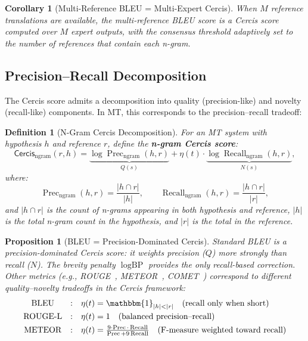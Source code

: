 \documentclass[12pt,a4paper]{article}
\newtheorem{proposition}[theorem]{Proposition}
\newtheorem{corollary}[theorem]{Corollary}
\newtheorem{definition}[theorem]{Definition}
\theoremstyle{remark}
\newcommand{\Cercis}{\textsf{Cercis}}
\DeclareMathOperator{\Precision}{Prec}
\DeclareMathOperator{\Recall}{Recall}
\begin{document}
\begin{corollary}[Multi-Reference BLEU = Multi-Expert Cercis]
\label{cor:multiref_cercis}
When $M$ reference translations are available, the multi-reference
BLEU score is a \Cercis{} score computed over $M$ expert outputs,
with the consensus threshold adaptively set to the number of
references that contain each n-gram.
\end{corollary}

\subsection{Precision--Recall Decomposition}

The \Cercis{} score admits a decomposition into quality (precision-like)
and novelty (recall-like) components. In MT, this corresponds to
the precision--recall tradeoff:

\begin{definition}[N-Gram Cercis Decomposition]
\label{def:ngram_cercis}
For an MT system with hypothesis $h$ and reference $r$, define
the \textbf{n-gram Cercis score}:
\begin{equation}
  \label{eq:ngram_cercis}
  \Cercis_{\text{ngram}}(r, h) = \underbrace{\log\Precision_{\text{ngram}}(h, r)}_{Q(s)}
    + \eta(t) \cdot \underbrace{\log\Recall_{\text{ngram}}(h, r)}_{N(s)},
\end{equation}
where:
\begin{equation}
  \Precision_{\text{ngram}}(h, r) = \frac{|h \cap r|}{|h|},
  \qquad
  \Recall_{\text{ngram}}(h, r) = \frac{|h \cap r|}{|r|},
\end{equation}
and $|h \cap r|$ is the count of n-grams appearing in both hypothesis
and reference, $|h|$ is the total n-gram count in the hypothesis,
and $|r|$ is the total in the reference.
\end{definition}

\begin{proposition}[BLEU = Precision-Dominated Cercis]
\label{prop:bleu_precision_cercis}
Standard BLEU is a precision-dominated \Cercis{} score: it weights
precision ($Q$) more strongly than recall ($N$). The brevity penalty
$\log\text{BP}$ provides the only recall-based correction. Other
metrics (e.g., ROUGE~\cite{lin2004rouge}, METEOR~\cite{banerjee2005meteor},
COMET~\cite{rei2020comet}) correspond to different quality--novelty
tradeoffs in the \Cercis{} framework:
\begin{equation}
  \begin{array}{ccl}
    \text{BLEU} &:& \eta(t) = \mathbbm{1}_{|h| < |r|} \quad \text{(recall only when short)} \\[4pt]
    \text{ROUGE-L} &:& \eta(t) = 1 \quad \text{(balanced precision--recall)} \\[4pt]
    \text{METEOR} &:& \eta(t) = \frac{9\cdot\Precision \cdot \Recall}{\Precision + 9\Recall} \quad \text{(F-measure weighted toward recall)}
  \end{array}
\end{equation}
\end{proposition}
\end{document}
